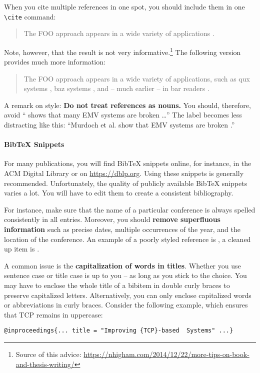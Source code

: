 When you cite multiple references in one spot, you should include them in one \verb|\cite| command:
\begin{quote}
  The FOO approach appears in a wide variety of applications \cite{murdoch_steven_j._chip_2010,anderson_ross_emv:_2014,kou_weidong_secure_2003}.
\end{quote}

Note, however, that the result is not very informative.\footnote{Source of this advice: \url{https://nhigham.com/2014/12/22/more-tips-on-book-and-thesis-writing/}} The following version provides much more information:
\begin{quote}
The FOO approach appears in a wide variety of applications, such as qux systems \cite{murdoch_steven_j._chip_2010}, baz systems \cite{anderson_ross_emv:_2014}, and -- much earlier -- in bar readers \cite{kou_weidong_secure_2003}.
\end{quote}

A remark on style: \textbf{Do not treat references as nouns.} You should, therefore, avoid ``\cite{murdoch_steven_j._chip_2010} shows that many EMV systems are broken \ldots'' The label becomes less distracting like this: ``Murdoch et al. show that EMV systems are broken  \cite{murdoch_steven_j._chip_2010}.''

\paragraph{BibTeX Snippets}

For many publications, you will find BibTeX snippets online, for instance, in the ACM Digital Library or on \url{https://dblp.org}. Using these snippets is generally recommended. Unfortunately, the quality of publicly available BibTeX snippets varies a lot. You will have to edit them to create a consistent bibliography.

For instance,%
 make sure that the name of a particular conference is always spelled consistently in all entries. Moreover, you should \textbf{remove superfluous information} such as precise dates, multiple occurrences of the year, and the location of the conference. An example of a poorly styled reference is \cite{BuchananRSS08}, a cleaned up item is \cite{DietrichKBF18}.

A common issue is the \textbf{capitalization of words in titles}.%
Whether you use sentence case or title case is up to you -- as long as you stick to the choice. You may have to enclose the whole title of a bibitem in double curly braces to preserve capitalized letters. Alternatively, you can only enclose capitalized words or abbreviations in curly braces. Consider the following example, which ensures that TCP remains in uppercase:
\begin{verbatim}
@inproceedings{... title = "Improving {TCP}-based  Systems" ...}
\end{verbatim}

